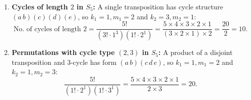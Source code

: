 \begin{example}
\begin{enumerate}[label=(\alph*)]
    \item \textbf{Cycles of length $2$ in $S_5$:}
    A single transposition has cycle structure $(a\,b)(c)(d)(e)$, so $k_1 = 1, m_1 = 2$ and $k_2 = 3, m_2 = 1$:
    \[
    \text{No. of cycles of length } 2 = \frac{5!}{(3! \cdot 1^3)(1! \cdot 2^1)} = \frac{5 \times 4 \times 3 \times 2 \times 1}{(3 \times 2 \times 1) \times 2} = \frac{20}{2} = 10.
    \]
    
    \item \textbf{Permutations with cycle type $(2, 3)$ in $S_5$:}
    A product of a disjoint transposition and $3$-cycle has form $(a\,b)(c\,d\,e)$, so $k_1 = 1, m_1 = 2$ and $k_2 = 1, m_2 = 3$:
    \[
    \frac{5!}{(1! \cdot 2^1)(1! \cdot 3^1)} = \frac{5 \times 4 \times 3 \times 2 \times 1}{2 \times 3} = 20.
    \]
\end{enumerate}
\end{example}
